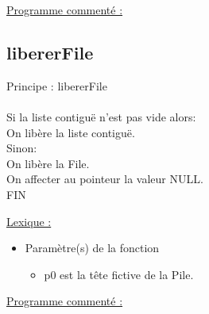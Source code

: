 \documentclass[a4paper]{article}
\newcommand\tab[1][1cm]{\hspace*{#1}}
\begin{document}
\underline{Programme commenté :}
\subsection{libererFile}

\begin{algorithm}

Principe : libererFile
\\
\\
\tab Si la liste contiguë n'est pas vide alors:
\\
\tab \tab On libère la liste contiguë.
\\
\tab  Sinon:
\\ 
\tab \tab  On libère la File.
\\
\tab On affecter au pointeur la valeur NULL.
\\


FIN
\end{algorithm}
\underline{Lexique :}

\begin{itemize}

\item Paramètre(s) de la fonction  

\begin{itemize}

\item p0 est la tête fictive de la Pile.

\end{itemize}

\end{itemize}

\underline{Programme commenté :}
\end{document}
